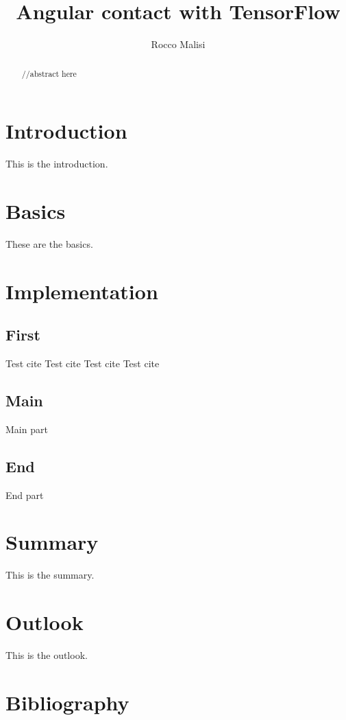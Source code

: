 \documentclass{article}
\title{Angular contact with TensorFlow}
\author{Rocco Malisi}
\begin{document}
\date{}
\maketitle

\newpage

\begin{abstract}
//abstract here
\end{abstract}

\newpage

\tableofcontents

\newpage

\section{Introduction}
This is the introduction.

\newpage

\section{Basics}
These are the basics.

\newpage

\section{Implementation}
\subsection{First}
Test cite \cite{weidman}
Test cite \cite{burkov}
Test cite \cite{james}
Test cite \cite{géron}
\subsection{Main}
Main part
\subsection{End}
End part

\newpage

\section{Summary}
This is the summary.

\newpage

\section{Outlook}
This is the outlook.

\newpage

\section{Bibliography}
\printbibliography 
\end{document}
